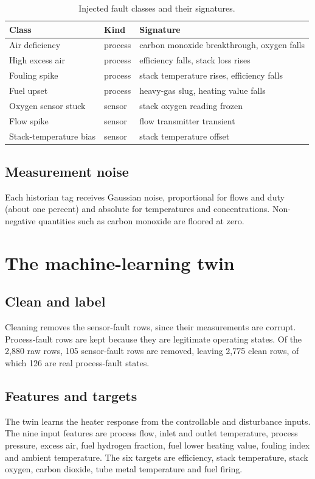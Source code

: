 \documentclass[11pt,a4paper]{article}
\begin{document}
\begin{table}[h]
\centering\small
\caption{Injected fault classes and their signatures.}
\label{tab:faults}
\begin{tabular}{@{}lll@{}}
\toprule
Class & Kind & Signature\\
\midrule
Air deficiency & process & carbon monoxide breakthrough, oxygen falls\\
High excess air & process & efficiency falls, stack loss rises\\
Fouling spike & process & stack temperature rises, efficiency falls\\
Fuel upset & process & heavy-gas slug, heating value falls\\
Oxygen sensor stuck & sensor & stack oxygen reading frozen\\
Flow spike & sensor & flow transmitter transient\\
Stack-temperature bias & sensor & stack temperature offset\\
\bottomrule
\end{tabular}
\end{table}

\subsection{Measurement noise}
Each historian tag receives Gaussian noise, proportional for flows and duty (about
one percent) and absolute for temperatures and concentrations. Non-negative
quantities such as carbon monoxide are floored at zero.

\section{The machine-learning twin}\label{sec:twin}

\subsection{Clean and label}
Cleaning removes the sensor-fault rows, since their measurements are corrupt.
Process-fault rows are kept because they are legitimate operating states. Of the
2{,}880 raw rows, 105 sensor-fault rows are removed, leaving 2{,}775 clean rows,
of which 126 are real process-fault states.

\subsection{Features and targets}
The twin learns the heater response from the controllable and disturbance inputs.
The nine input features are process flow, inlet and outlet temperature, process
pressure, excess air, fuel hydrogen fraction, fuel lower heating value, fouling
index and ambient temperature. The six targets are efficiency, stack temperature,
stack oxygen, carbon dioxide, tube metal temperature and fuel firing.
\end{document}
